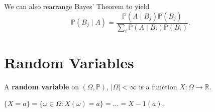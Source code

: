 \begin{theorem}
	We can also rearrange Bayes' Theorem to yield
	\[
		\mathbb{P}(B_j \mid A) = \frac{\mathbb{P}(A \mid  B_j)\mathbb{P}(B_j)}{\sum_i \mathbb{P}(A\mid B_i) \mathbb{P}(B_i)}
	.\] 
\end{theorem}

\section{Random Variables}

\begin{definition}
	A \textbf{random variable} on \( (\Omega, \mathbb{P}) \), \( |\Omega | < \infty \) is a function \( X: \Omega  \to  \mathbb{R} \).
\end{definition}

\begin{notation}
	\( \{X = a\} = \{ \omega  \in \Omega : X(\omega ) = a \} = \ldots = X-1(a) \).
\end{notation}
